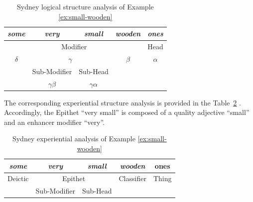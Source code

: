     \begin{table}[!ht]
        \centering
        \begin{tabular}{c|c|c|cc}
            \hline
            \multicolumn{1}{|c|}{\textit{some}} & \textit{very} & \textit{small} & \multicolumn{1}{c|}{\textit{wooden}} & \multicolumn{1}{c|}{\textit{ones}} \\ \hline
            \multicolumn{4}{|c|}{Modifier}                                                                              & \multicolumn{1}{c|}{Head}          \\ \hline
            \multicolumn{1}{|c|}{$\delta$}             & \multicolumn{2}{c|}{$\gamma$}         & \multicolumn{1}{c|}{$\beta$}               & \multicolumn{1}{c|}{$\alpha$}             \\ \hline
            & Sub-Modifier  & Sub-Head       &                                      &                                    \\ \cline{2-3}    
            \multicolumn{1}{l|}{}               & \multicolumn{1}{c|}{$\gamma\beta$} & \multicolumn{1}{c|}{$\gamma\alpha$} & \multicolumn{1}{l}{}                 & \multicolumn{1}{l}{}               \\ \cline{2-3}
        \end{tabular}
        \caption{Sydney logical structure analysis of Example \ref{ex:small-wooden}}
        \label{tab:example-substructure-analisys-logical}
    \end{table}
    
    The corresponding experiential structure analysis is provided in the \mbox{Table \ref{tab:example-substructure-analisys}} \citet[391]{Halliday2013}. Accordingly, the Epithet ``very small'' is composed of a quality adjective ``small'' and an enhancer modifier ``very''. 
     
    \begin{table}[!ht]
        \centering
        \begin{tabular}{c|c|c|cc}
            \hline
            \multicolumn{1}{|c|}{\textit{some}}    & \textit{very}            & \textit{small}      & \multicolumn{1}{c|}{\textit{wooden}}     & \multicolumn{1}{c|}{ones}  \\ \hline
            \multicolumn{1}{|c|}{Deictic} & \multicolumn{2}{c|}{Epithet} & \multicolumn{1}{c|}{Classifier} & \multicolumn{1}{c|}{Thing} \\ \hline
            & Sub-Modifier  & Sub-Head   & \multicolumn{2}{c}{}                                         \\ \cline{2-3}
        \end{tabular}
        \caption{Sydney experiential analysis of Example \ref{ex:small-wooden}}
        \label{tab:example-substructure-analisys}
    \end{table}

